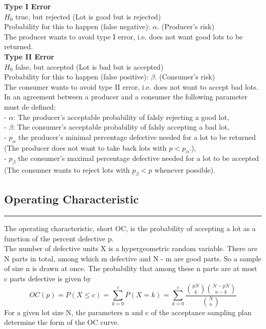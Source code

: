 \textbf{Type I Error}\\
$H_0$ true, but rejected (Lot is good but is rejected)\\
Probability for this to happen (false negative): $\alpha$. (Producer's risk)\\
The producer wants to avoid type I error, i.e. does not want good lots to be returned.\\

\textbf{Type II Error}\\
$H_0$ false, but accepted (Lot is bad but is accepted)\\
Probability for this to happen (false positive): $\beta$. (Consumer's risk)\\
The consumer wants to avoid type II error, i.e. does not want to accept bad lots.\\


In an agreement between a producer and a consumer the following parameter must de defined:\\
- $\alpha$: The producer's acceptable probability of falsly rejecting a good lot,\\
- $\beta$: The consumer's acceptable probability of falsly accepting a bad lot,\\
- $p_{\alpha}$ the producer's minimal percentage defective needed for a lot to be returned (The producer does not want to take back lots with $p < p_{\alpha}$.),\\
- $p_{\beta}$ the consumer's maximal percentage defective needed for a lot to be accepted (The consumer wants to reject lots with $p_{\beta} < p$ whenever possible).

\subsection{Operating Characteristic}
\noindent\rule[\linienAbstand]{\linewidth}{\linienDicke}
The operating characteristic, short OC, is the probability of accepting a lot as a function of the percent defective p.\\
The number of defective units X is a hypergeometric random variable. There are N parts in total, among which m defective and N - m are good parts. So a sample of size n is drawn at once. The probability that among these n parts are at most c parts defective is given by
\begin{equation}
  OC(p) = P(X \leq c)= \sum^c_{k=0} P(X = k) = \sum^c_{k=0} \frac{\binom{pN}{k}\binom{N-pN}{n-k}}{\binom{N}{n}}
\end{equation}
For a given lot size N, the parameters n and c of the acceptance sampling plan determine the form of the OC curve.\\

